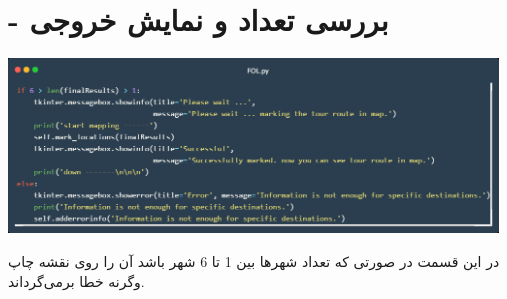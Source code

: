 \documentclass[12pt, dvipsnames, svgnames, x11names,]{article}
\begin{document}
	\section{ - بررسی تعداد و نمایش خروجی}
		\begin{center}
			\includegraphics[width=13cm]{images/09}
		\end{center}
		{\normalsize در این قسمت در صورتی که تعداد شهرها بین 1 تا 6 شهر باشد آن را روی نقشه چاپ وگرنه خطا برمی‌گرداند.}
		
	
	
	
\end{document}
